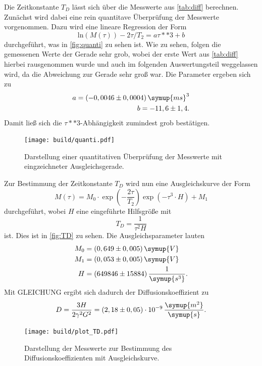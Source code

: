 Die Zeitkonstante $T_D$ lässt sich über die Messwerte aus \autoref{tab:diff} berechnen.
Zunächst wird dabei eine rein quantitave Überprüfung der Messwerte vorgenommen.
Dazu wird eine lineare Regression der Form 
\begin{equation*}
     \text{ln}(M(\tau)) - 2\tau /T_2 = a \tau**3 + b
\end{equation*}     
durchgeführt,
was in \autoref{fig:quanti} zu sehen ist.
Wie zu sehen, folgen die gemessenen Werte der Gerade sehr grob, wobei der erste Wert aus \autoref{tab:diff}
hierbei rausgenommen wurde und auch im folgenden Auswertungsteil weggelassen wird, da die Abweichung zur Gerade 
sehr groß war.
Die Parameter ergeben sich zu 
\begin{align*}
    a = (-0,0046 \pm 0,0004) \, \symup{ms}^3 \\
    b = -11,6 \pm 1,4.
\end{align*}
Damit ließ sich die $\tau**3$-Abhängigkeit zumindest grob bestätigen.\\
\begin{figure}
    \centering
    \texttt{[image: build/quanti.pdf]}
    \caption{Darstellung einer quantitativen Überprüfung der Messwerte mit eingzeichneter Ausgleichsgerade.}
    \label{fig:quanti}
\end{figure}
Zur Bestimmung der Zeitkonstante $T_D$ wird nun eine Ausgleichskurve der Form 
\begin{equation*}
    M(\tau) = M_0 \cdot \exp \left( - \frac{2 \tau}{T_2}  \right) \exp \left( - \tau^3 \cdot H   \right) + M_1
\end{equation*}
durchgeführt, wobei $H$ eine eingeführte Hilfsgröße mit 
\begin{equation*}
    T_D = \frac{1}{\tau^2 H}
\end{equation*}
ist. Dies ist in \autoref{fig:TD} zu sehen.
Die Ausgleichsparameter lauten
\begin{align*}
    M_0 &= (0,649 \pm 0,005) \, \symup{V} \\
    M_1 &= (0,053 \pm 0,005) \, \symup{V} \\
    H   &= (649846 \pm 15884) \, \frac{1}{\symup{s^3}}.
\end{align*}
Mit GLEICHUNG ergibt sich dadurch der Diffusionskoeffizient zu
\begin{equation*}
    D = \frac{3 H}{2 \gamma^2 G^2} = (2,18 \pm 0,05 ) \cdot 10^{-9} \, \frac{\symup{m^2}}{\symup{s}}.
\end{equation*}
\begin{figure}
    \centering
    \texttt{[image: build/plot\_TD.pdf]}
    \caption{Darstellung der Messwerte zur Bestimmung des Diffusionskoeffizienten mit Ausgleichskurve.}
    \label{fig:TD}
\end{figure}

